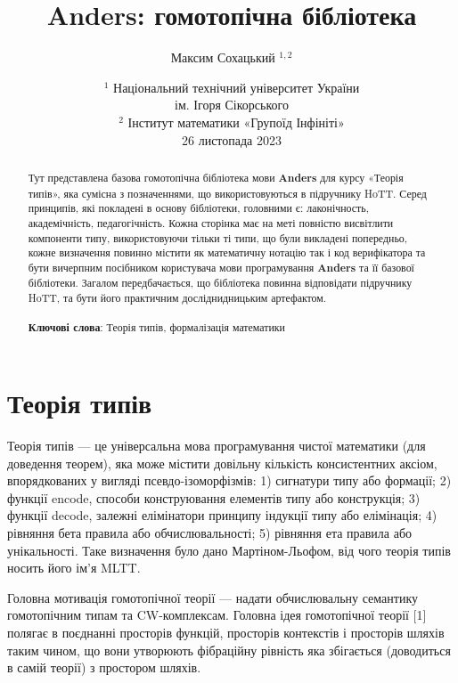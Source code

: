 \documentclass{article}
\theoremstyle{definition}
\begin{document}
\title{Anders: гомотопічна бібліотека}
\author{Максим Сохацький $^{1,2}$}
\date{ \small $^1$ Національний технічний університет України \\
       ім. Ігоря Сікорського \\
       \small $^2$ Інститут математики «Групоїд Інфініті» \\
       26 листопада 2023 }
\maketitle

\begin{abstract}
Тут представлена базова гомотопічна бібліотека мови {\bf Anders} для курсу «Теорія типів»,
яка сумісна з позначеннями, що використовуються в підручнику HoTT.
Серед принципів, які покладені в основу бібліотеки, головними є:
лаконічность, академічність, педагогічність. Кожна сторінка має
на меті повністю висвітлити компоненти типу, використовуючи тільки
ті типи, що були викладені попередньо, кожне визначення повинно
містити як математичну нотацію так і код верифікатора та бути
вичерпним посібником користувача мови програмування {\bf Anders} та
її базової бібліотеки. Загалом передбачається, що бібліотека
повинна відповідати підручнику HoTT, та бути його практичним
досліднидницьким артефактом.
\\
\\
{\bf Ключові слова}: Теорія типів, формалізація математики
\end{abstract}

\section*{Теорія типів}
Теорія типів --- це універсальна мова програмування чистої
математики (для доведення теорем), яка може містити довільну
кількість консистентних аксіом, впорядкованих у вигляді псевдо-ізоморфізмів:
1) сигнатури типу або формації;
2) функції encode, способи конструювання елементів типу або конструкція;
3) функції decode, залежні елімінатори принципу індукції типу або елімінація;
4) рівняння бета правила або обчислювальності;
5) рівняння ета правила або унікальності.
Таке визначення було дано Мартіном-Льофом,
від чого теорія типів носить його ім'я MLTT.

Головна мотивація гомотопічної теорії — надати обчислювальну
семантику гомотопічним типам та CW-комплексам. Головна ідея
гомотопічної теорії [1] полягає в поєднанні просторів функцій,
просторів контекстів  і просторів шляхів  таким чином, що вони
утворюють фібраційну рівність яка збігається (доводиться в самій
теорії) з простором шляхів.
\end{document}
